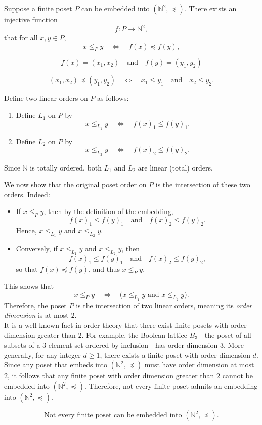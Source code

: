 \documentclass{report}
\begin{document}
\begin{proofWithHibiscus}
  Suppose a finite poset $P$ can be embedded into $(\mathbb{N}^2, \preceq)$. There exists an injective function
  \[ f: P \to \mathbb{N}^2, \]
 that for all $x,y\in P$,
  \[ x \le_P y \quad \Longleftrightarrow \quad f(x) \preceq f(y), \]
  
  \[ f(x) = (x_1,x_2) \quad \text{and} \quad f(y) = (y_1,y_2)\] 

  \[ (x_1,x_2) \preceq (y_1,y_2) \quad \Longleftrightarrow \quad x_1 \le y_1 \quad \text{and} \quad x_2 \le y_2. \]

  Define two linear orders on $P$ as follows:
  \begin{enumerate}[label=\textbf{Order \arabic*:}]
      \item Define $L_1$ on $P$ by
      \[
      x \le_{L_1} y \quad \Longleftrightarrow \quad f(x)_1 \le f(y)_1.
      \]
      \item Define $L_2$ on $P$ by
      \[
      x \le_{L_2} y \quad \Longleftrightarrow \quad f(x)_2 \le f(y)_2.
      \]
  \end{enumerate}
  Since $\mathbb{N}$ is totally ordered, both $L_1$ and $L_2$ are linear (total) orders.

  We now show that the original poset order on $P$ is the intersection of these two orders. Indeed:
  \begin{itemize}
      \item If $x \le_P y$, then by the definition of the embedding, 
      \[
      f(x)_1 \le f(y)_1 \quad \text{and} \quad f(x)_2 \le f(y)_2.
      \]
      Hence, $x \le_{L_1} y$ and $x \le_{L_2} y$.
      \item Conversely, if $x \le_{L_1} y$ and $x \le_{L_2} y$, then
      \[
      f(x)_1 \le f(y)_1 \quad \text{and} \quad f(x)_2 \le f(y)_2,
      \]
      so that $f(x) \preceq f(y)$, and thus $x \le_P y$.
  \end{itemize}

  This shows that
  \[
  x \le_P y \quad \Longleftrightarrow \quad \bigl( x \le_{L_1} y \text{ and } x \le_{L_2} y \bigr).
  \]
  Therefore, the poset $P$ is the intersection of two linear orders, meaning its \emph{order dimension} is at most $2$. \\

  It is a well-known fact in order theory that there exist finite posets with order dimension greater than $2$. For example, the Boolean lattice $B_3$---the poset of all subsets of a $3$-element set ordered by inclusion---has order dimension $3$. More generally, for any integer $d \ge 1$, there exists a finite poset with order dimension $d$.\\

  Since any poset that embeds into $(\mathbb{N}^2, \preceq)$ must have order dimension at most $2$, it follows that any finite poset with order dimension greater than $2$ cannot be embedded into $(\mathbb{N}^2, \preceq)$. Therefore, not every finite poset admits an embedding into $(\mathbb{N}^2, \preceq)$.

  \[
  \boxed{\text{Not every finite poset can be embedded into } (\mathbb{N}^2, \preceq).}
  \]
\end{proofWithHibiscus}
\end{document}
